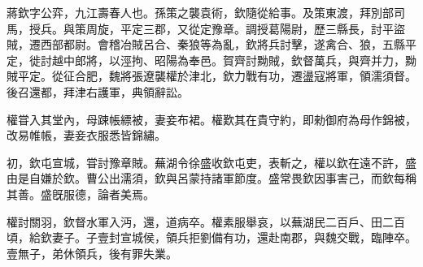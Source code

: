 \begin{pinyinscope}
 
 
 蔣欽字公弈，九江壽春人也。孫策之襲袁術，欽隨從給事。及策東渡，拜別部司馬，授兵。與策周旋，平定三郡，又從定豫章。調授葛陽尉，歷三縣長，討平盜賊，遷西部都尉。會稽冶賊呂合、秦狼等為亂，欽將兵討擊，遂禽合、狼，五縣平定，徙討越中郎將，以涇拘、昭陽為奉邑。賀齊討黝賊，欽督萬兵，與齊并力，黝賊平定。從征合肥，魏將張遼襲權於津北，欽力戰有功，遷盪寇將軍，領濡須督。後召還都，拜津右護軍，典領辭訟。
 
 
 
 
 權甞入其堂內，母踈帳縹被，妻妾布裙。權歎其在貴守約，即勑御府為母作錦被，改易帷帳，妻妾衣服悉皆錦繡。
 
 
 
 
 初，欽屯宣城，甞討豫章賊。蕪湖令徐盛收欽屯吏，表斬之，權以欽在遠不許，盛由是自嫌於欽。曹公出濡須，欽與呂蒙持諸軍節度。盛常畏欽因事害己，而欽每稱其善。盛旣服德，論者美焉。
 
 
 
 
 
 
 權討關羽，欽督水軍入沔，還，道病卒。權素服舉哀，以蕪湖民二百戶、田二百頃，給欽妻子。子壹封宣城侯，領兵拒劉備有功，還赴南郡，與魏交戰，臨陣卒。壹無子，弟休領兵，後有罪失業。
 
 
\end{pinyinscope}
